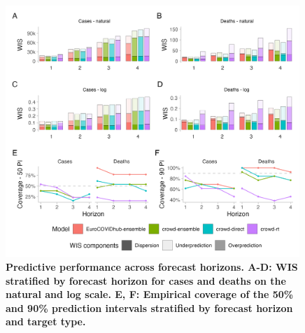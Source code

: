 \documentclass[10pt,a4paper,twocolumn]{article}
\begin{document}





\begin{figure}[ht]
\includegraphics[width=0.99\textwidth]{../output/figures/performance.png}
\caption{\bf{Predictive performance across forecast horizons.} A-D: WIS stratified by forecast horizon for cases and deaths on the natural and log scale. E, F: Empirical coverage of the 50\% and 90\% prediction intervals stratified by forecast horizon and target type.}
\label{fig:performance}
\end{figure}
\end{document}
